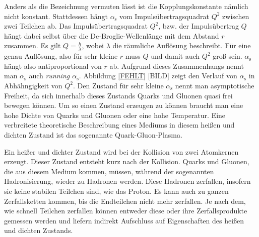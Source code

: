 Anders als die Bezeichnung vermuten l\"asst ist die Kopplungskonstante n\"amlich nicht konstant.
Stattdessen h\"angt $\alpha_\text{s}$ vom Impulsübertragsquadrat $Q^{2}$ zwischen zwei Teilchen ab.
Das Impulsübertragsquadrat $Q^{2}$, bzw. der Impulsübertrag $Q$ h\"angt dabei selbst \"uber die De-Broglie-Wellenl\"ange mit dem Abstand $r$ zusammen.
Es gilt $Q = \frac{h}{\lambda}$, wobei $\lambda$ die r\"aumliche Aufl\"osung beschreibt.
F\"ur eine genau Aufl\"osung, also f\"ur  sehr kleine $r$ muss $Q$ und damit auch $Q^{2}$ gro{\ss} sein.
$\alpha_\text{s}$ h\"angt also antiproportional von $r$ ab.
Aufgrund dieses Zusammenhangs nennt man $\alpha_\text{s}$ auch \textit{running $\alpha_\text{s}$}. Abbildung \ref{FEHLT} [BILD] zeigt den Verlauf von $\alpha_\text{s}$ in Abh\"ahngigkeit von $Q^{2}$.
Den Zustand f\"ur sehr kleine $\alpha_\text{s}$ nennt man asymptotische Freiheit, da sich innerhalb dieses Zustands Quarks und Gluonen quasi frei bewegen k\"onnen.
Um so einen Zustand erzeugen zu k\"onnen braucht man eine hohe Dichte von Quarks und Gluonen oder eine hohe Temperatur.
Eine verbreitete theoretische Beschreibung eines Mediums in diesem hei{\ss}en und dichten Zustand ist das sogenannte Quark-Gluon-Plasma.

Ein hei{\ss}er und dichter Zustand wird bei der Kollision von zwei Atomkernen erzeugt.
Dieser Zustand entsteht kurz nach der Kollision.
Quarks und Gluonen, die aus diesem Medium kommen, m\"ussen, w\"ahrend der sogenannten Hadronisierung, wieder zu Hadronen werden. Diese Hadronen zerfallen, insofern sie keine stabilen Teilchen sind, wie das Proton.
Es kann auch zu ganzen Zerfallsketten kommen, bis die Endteilchen nicht mehr zerfallen.
Je nach dem, wie schnell Teilchen zerfallen k\"onnen entweder diese oder ihre Zerfallsprodukte gemessen werden und liefern indirekt Aufschluss auf Eigenschaften des hei{\ss}en und dichten Zustands.